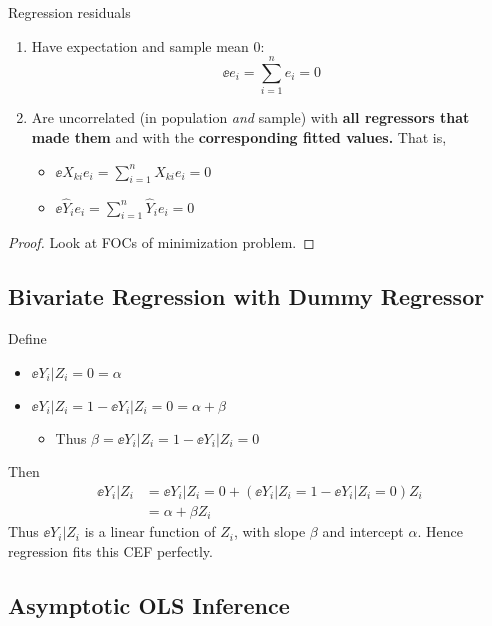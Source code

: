 \documentclass[11pt]{article}
\begin{document}
Regression residuals
\begin{enumerate}
	\item Have expectation and sample mean $0$:
	\begin{equation}
		\ee{e_i} = \sum_{i=1}^n e_i = 0
	\end{equation}
	\item Are uncorrelated (in population \emph{and} sample) with \textbf{all regressors that made them} and with the \textbf{corresponding fitted values.} That is,
	\begin{itemize}
		\item $\ee{X_{ki} e_i} = \sum_{i=1}^n X_{ki}e_i = 0$
		\item $\ee{\hat{Y}_i e_i} = \sum_{i=1}^n \hat{Y}_i e_i = 0$
	\end{itemize}
\end{enumerate}

\begin{proof}
	Look at FOCs of minimization problem. 
\end{proof}

\subsection{Bivariate Regression with Dummy Regressor}

Define
\begin{itemize}
	\item $\ee{Y_i | Z_i = 0} = \alpha$
	\item $\ee{Y_i | Z_i = 1} - \ee{Y_i | Z_i = 0} = \alpha + \beta$ 
	\begin{itemize}
		\item Thus $\beta = \ee{Y_i | Z_i = 1} - \ee{Y_i | Z_i = 0}$
	\end{itemize}
\end{itemize}

Then
\begin{align*}
	\ee{Y_i | Z_i} &= \ee{Y_i | Z_i = 0} + (\ee{Y_i | Z_i = 1} - \ee{Y_i | Z_i = 0})Z_i \\
	&= \alpha + \beta Z_i
\end{align*}
Thus $\ee{Y_i | Z_i}$ is a linear function of $Z_i$, with slope $\beta$ and intercept $\alpha$. Hence regression fits this CEF perfectly. 

\subsection{Asymptotic OLS Inference}
\end{document}
